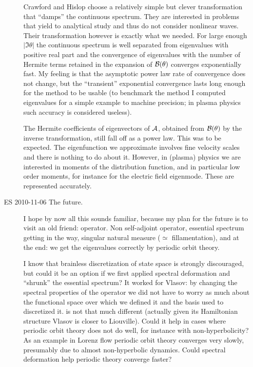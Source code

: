 \begin{description}
Crawford and Hislop choose a relatively simple but clever transformation that
``damps'' the continuous spectrum. They are interested in problems
that yield to analytical study and thus do not consider nonlinear
waves. Their transformation however is exactly what we needed. For large enough
$|\Im\theta|$ the continuous spectrum is well separated from eigenvalues with
positive real part and the convergence of eigenvalues with the number of
Hermite terms retained in the expansion of $\mathcal{B}(\theta)$ converges
exponentially fast. My feeling is that the asymptotic power law
rate of convergence does not change, but the ``transient'' exponential
convergence lasts long enough for the method to be usable (to benchmark
the method I computed eigenvalues for a simple example to machine precision;
in plasma physics such accuracy is considered useless).

The Hermite coefficients of eigenvectors of $\mathcal{A}$,
obtained from $\mathcal{B}(\theta)$ by the inverse
transformation, still fall off as a power law.
This was to be expected. The eigenfunction we approximate involves fine
velocity scales and there is nothing to do about it. However, in (plasma)
physics we are interested in moments of the distribution function, and in
particular low order moments, for instance for the electric field eigenmode.
These are represented accurately.

\item[ES 2010-11-06 The future.] I hope by now all this sounds familiar,
because my plan for the future is to visit an old friend: {\FP}
operator. Non self-adjoint operator, essential spectrum getting in the way,
singular natural measure ($\simeq$ fillamentation),
and at the end: we get the eigenvalues correctly
by periodic orbit theory.

I know that brainless discretization of state space is strongly discouraged, but could
it be an option if we first applied spectral deformation and ``shrunk'' the essential
spectrum? It worked for Vlasov: by changing the spectral properties of the operator
we did not have to worry as much about the functional space over which we defined
it and the basis used to discretized it.
{\FP} is not that much different
(actually given its Hamiltonian structure Vlasov is closer to Liouville).
Could it help in cases where periodic orbit theory does not do well, for instance
with non-hyperbolicity? As an example in Lorenz flow periodic orbit theory
converges very slowly, presumably due to almost non-hyperbolic dynamics.
Could spectral deformation help periodic theory converge faster?


\end{description}
